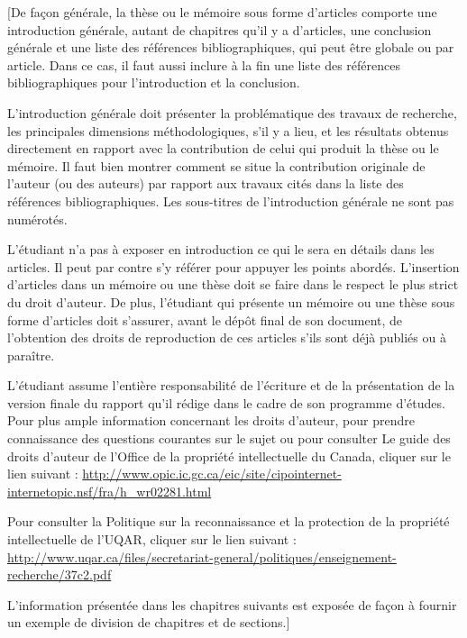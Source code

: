 \begin{sloppypar} [De façon générale, la thèse ou le mémoire sous forme d’articles comporte une introduction générale, autant de chapitres qu’il y a d’articles, une conclusion générale et une liste des références bibliographiques, qui peut être globale ou par article. Dans ce cas, il faut aussi inclure à la fin une liste des références bibliographiques pour l’introduction et la conclusion.

L’introduction générale doit présenter la problématique des travaux de recherche, les principales dimensions méthodologiques, s'il y a lieu, et les résultats obtenus directement en rapport avec la contribution de celui qui produit la thèse ou le mémoire. Il faut bien montrer comment se situe la contribution originale de l'auteur (ou des auteurs) par rapport aux travaux cités dans la liste des références bibliographiques. Les sous-titres de l’introduction générale ne sont pas numérotés.

L'étudiant n'a pas à exposer en introduction ce qui le sera en détails dans les articles. Il peut par contre s’y référer pour appuyer les points abordés.
L’insertion d’articles dans un mémoire ou une thèse doit se faire dans le respect le plus strict du droit d’auteur. De plus, l'étudiant qui présente un mémoire ou une thèse sous forme d’articles doit s'assurer, avant le dépôt final de son document, de l'obtention des droits de reproduction de ces articles s'ils sont déjà publiés ou à paraître.

L'étudiant assume l'entière responsabilité de l'écriture et de la présentation de la version finale du rapport qu'il rédige dans le cadre de son programme d'études. Pour plus ample information concernant les droits d’auteur, pour prendre connaissance des questions courantes sur le sujet ou pour consulter Le guide des droits d’auteur de l’Office de la propriété intellectuelle du Canada, cliquer sur le lien suivant : \url{http://www.opic.ic.gc.ca/eic/site/cipointernet-internetopic.nsf/fra/h_wr02281.html}

Pour consulter la Politique sur la reconnaissance et la protection de la propriété intellectuelle de l’UQAR, cliquer sur le lien suivant : \url{http://www.uqar.ca/files/secretariat-general/politiques/enseignement-recherche/37c2.pdf}

L’information présentée dans les chapitres suivants est exposée de façon à fournir un exemple de division de chapitres et de sections.] \end{sloppypar}

